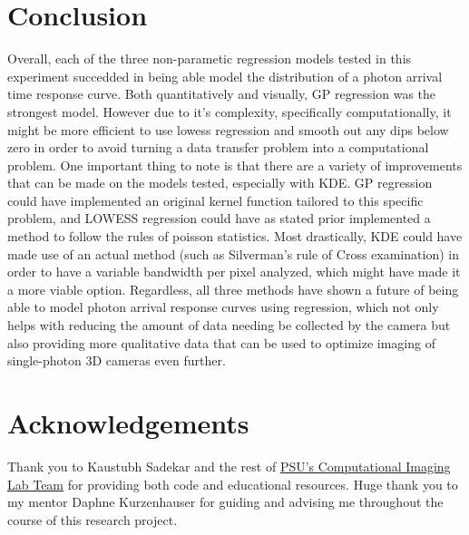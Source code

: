 \documentclass[letterpaper,12pt]{article}
\begin{document}
\section{Conclusion}
Overall, each of the three non-parametic regression models tested in this experiment succedded 
in being able model the distribution of a photon arrival time response curve. Both quantitatively
and visually, GP regression was the strongest model. However due to it's complexity, specifically 
computationally, it might be more efficient to use lowess regression and smooth out any dips 
below zero in order to avoid turning a data transfer problem into a computational problem. One
important thing to note is that there are a variety of improvements that can be made on the models
tested, especially with KDE. GP regression could have implemented an original kernel function
tailored to this specific problem, and LOWESS regression could have as stated prior implemented
a method to follow the rules of poisson statistics. Most drastically, KDE could have made use
of an actual method (such as Silverman's rule of Cross examination) in order to have a variable
bandwidth per pixel analyzed, which might have made it a more viable option. Regardless, all
three methods have shown a future of being able to model photon arrival response curves using
regression, which not only helps with reducing the amount of data needing be collected by the
camera but also providing more qualitative data that can be used to optimize imaging of
single-photon 3D cameras even further.

\section{Acknowledgements}
Thank you to Kaustubh Sadekar and the rest of 
\href{https://www.computational.camera/team}{PSU's Computational Imaging Lab Team} for providing
both code and educational resources. Huge thank you to my mentor Daphne Kurzenhauser for guiding 
and advising me throughout the course of this research project.

\printbibliography
\end{document}
